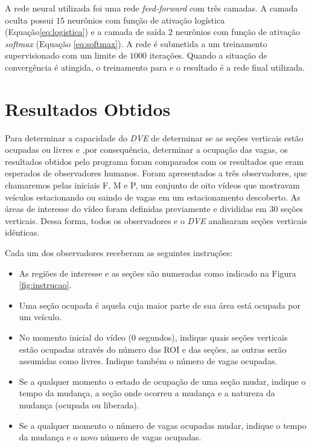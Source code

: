 A rede neural utilizada foi uma rede \textit{feed-forward} com três camadas. A camada oculta possui $15$ neurônios com função de ativação logística (Equação\ref{eq:logistica}) e a camada de saída $2$ neurônios com função de ativação \textit{softmax} (Equação \ref{eq:softmax}). A rede é submetida a um treinamento supervisionado com um limite de $1000$ iterações. Quando a situação de convergência é atingida, o treinamento para e o resultado é a rede final utilizada.


\section{Resultados Obtidos}

Para determinar a capacidade do \textit{DVE} de determinar se as seções verticais estão ocupadas ou livres e ,por consequência, determinar a ocupação das vagas, os resultados obtidos pelo programa foram comparados com os resultados que eram esperados de observadores humanos. Foram apresentados a três observadores, que chamaremos pelas iniciais F, M e P, um conjunto de oito vídeos que mostravam veículos estacionando ou saindo de vagas em um estacionamento descoberto. As áreas de interesse do vídeo foram definidas previamente e divididas em $30$ seções verticais. Dessa forma, todos os observadores e o \textit{DVE} analisaram seções verticais idênticas. 

Cada um dos observadores receberam as seguintes instruções:

\begin{itemize}
  \item As regiões de interesse e as seções são numeradas como indicado na Figura \ref{fig:instrucao}.
	\item Uma seção ocupada é aquela cuja maior parte de sua área está ocupada por um veículo.
	\item No momento inicial do vídeo ($0$ segundos), indique quais seções verticais estão ocupadas através do número das ROI e das seções, as outras serão assumidas como livres. Indique também o número de vagas ocupadas.
	\item Se a qualquer momento o estado de ocupação de uma seção mudar, indique o tempo da mudança, a seção onde ocorreu a mudança e a natureza da mudança (ocupada ou liberada).
	\item Se a qualquer momento o número de vagas ocupadas mudar, indique o tempo da mudança e o novo número de vagas ocupadas.
\end{itemize}

